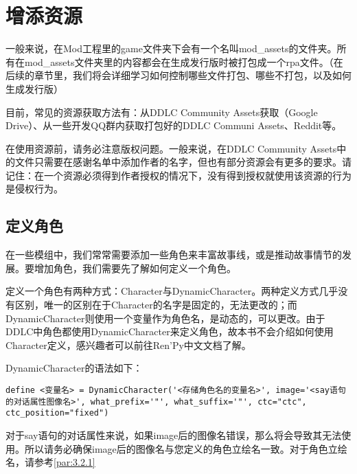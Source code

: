 \section{增添资源}
一般来说，在Mod工程里的game文件夹下会有一个名叫mod\_assets的文件夹。所有在mod\_assets文件夹里的内容都会在生成发行版时被打包成一个rpa文件。（在后续的章节里，我们将会详细学习如何控制哪些文件打包、哪些不打包，以及如何生成发行版）

\begin{ExtraKnowledge}
    目前，常见的资源获取方法有：从DDLC Community Assets获取（Google Drive）、从一些开发QQ群内获取打包好的DDLC Communi Assets、Reddit等。
\end{ExtraKnowledge}

\begin{Attention}
    在使用资源前，请务必注意版权问题。一般来说，在DDLC Community Assets中的文件只需要在感谢名单中添加作者的名字，但也有部分资源会有更多的要求。请记住：在一个资源必须得到作者授权的情况下，没有得到授权就使用该资源的行为是侵权行为。
\end{Attention}


\subsection{定义角色}
在一些模组中，我们常常需要添加一些角色来丰富故事线，或是推动故事情节的发展。要增加角色，我们需要先了解如何定义一个角色。

定义一个角色有两种方式：Character与DynamicCharacter。两种定义方式几乎没有区别，唯一的区别在于Character的名字是固定的，无法更改的；而DynamicCharacter则使用一个变量作为角色名，是动态的，可以更改。由于DDLC中角色都使用DynamicCharacter来定义角色，故本书不会介绍如何使用Character定义，感兴趣者可以前往Ren'Py中文文档了解。

DynamicCharacter的语法如下：

\begin{lstlisting}
define <变量名> = DynamicCharacter('<存储角色名的变量名>', image='<say语句的对话属性图像名>', what_prefix='"', what_suffix='"', ctc="ctc", ctc_position="fixed")
\end{lstlisting}

\begin{Warning}
    对于say语句的对话属性来说，如果image后的图像名错误，那么将会导致其无法使用。所以请务必确保image后的图像名与您定义的角色立绘名一致。对于角色立绘名，请参考\ref{par:3.2.1}
\end{Warning}

